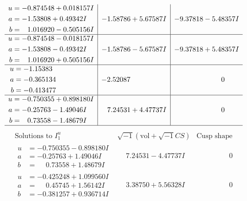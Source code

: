 \documentclass[1p]{elsarticle_modified}
\theoremstyle{definition}
\newcommand{\I}{\sqrt{-1}}
\begin{document}
$$\begin{array}{c|c|c}
\begin{aligned}
u &= -0.874548 + 0.018157 I \\
a &= -1.53808 + 0.49342 I \\
b &= \phantom{-}1.016920 - 0.505156 I\end{aligned}
 & -1.58786 + 5.67587 I & -9.37818 - 5.48357 I \\ \hline\begin{aligned}
u &= -0.874548 - 0.018157 I \\
a &= -1.53808 - 0.49342 I \\
b &= \phantom{-}1.016920 + 0.505156 I\end{aligned}
 & -1.58786 - 5.67587 I & -9.37818 + 5.48357 I \\ \hline\begin{aligned}
u &= -1.15383\phantom{ +0.000000I} \\
a &= -0.365134\phantom{ +0.000000I} \\
b &= -0.413477\phantom{ +0.000000I}\end{aligned}
 & -2.52087\phantom{ +0.000000I} & \phantom{-0.000000 } 0 \\ \hline\begin{aligned}
u &= -0.750355 + 0.898180 I \\
a &= -0.25763 - 1.49046 I \\
b &= \phantom{-}0.73558 - 1.48679 I\end{aligned}
 & \phantom{-}7.24531 + 4.47737 I & \phantom{-0.000000 } 0\\
 \hline 
 \end{array}$$\newpage$$\begin{array}{c|c|c}  
\text{Solutions to }I^u_{1}& \I (\text{vol} + \sqrt{-1}CS) & \text{Cusp shape}\\
 \hline 
\begin{aligned}
u &= -0.750355 - 0.898180 I \\
a &= -0.25763 + 1.49046 I \\
b &= \phantom{-}0.73558 + 1.48679 I\end{aligned}
 & \phantom{-}7.24531 - 4.47737 I & \phantom{-0.000000 } 0 \\ \hline\begin{aligned}
u &= -0.425248 + 1.099560 I \\
a &= \phantom{-}0.45745 + 1.56142 I \\
b &= -0.381257 + 0.936714 I\end{aligned}
 & \phantom{-}3.38750 + 5.56328 I & \phantom{-0.000000 } 0 \\ \hline\begin{aligned}

\end{aligned}
\end{array}$$
\end{document}

